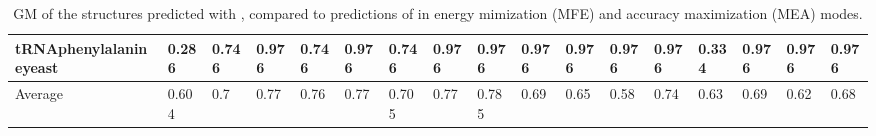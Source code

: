 \documentclass[11pt]{article} %
\begin{document}
\begin{table}[H]
\begin{adjustbox}{max width=1\textwidth}
\begin{tabular}{@{}lHHHHHHHHHHHHHHHH@{}}
 	tRNAphenylalanineyeast        & 0.286 & 0.746 & 0.976    & 0.746 & 0.976 & 0.746    & 0.976 & 0.976 & 0.976    & 0.976 & 0.976 & 0.976                   & 0.334 & 0.976 & 0.976    & 0.976                    \\ \midrule
 	Average                       & 0.604 & 0.7   & 0.77     & 0.76  & 0.77  & 0.705    & 0.77  & 0.785 & 0.69     & 0.65  & 0.58  & 0.74                    & 0.63  & 0.69  & 0.62     & 0.68                     \\ \bottomrule
 \end{tabular}
\end{adjustbox}
\caption{GM of the structures predicted with \OurTool{}, compared to predictions of  in energy mimization (MFE) and accuracy maximization (MEA) modes.}
\end{table}
\end{document}
